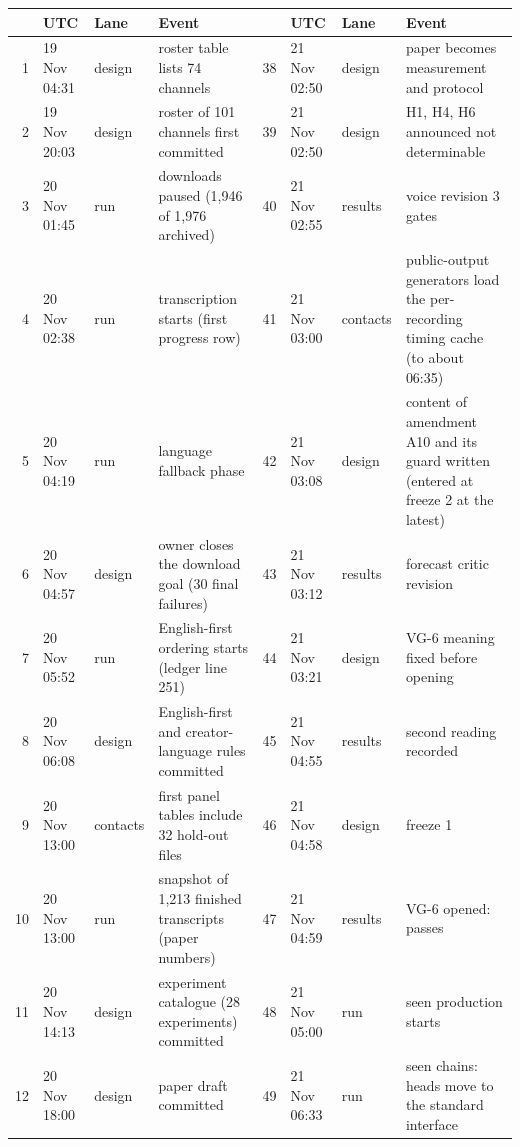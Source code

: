 {\tiny\setlength{\tabcolsep}{2pt}
\begin{tabular}{@{}rllp{}rllp{}@{}}
\toprule
 & UTC & Lane & Event &  & UTC & Lane & Event \\
\midrule
1 & 19 Nov 04:31 & design & roster table lists 74 channels & 38 & 21 Nov 02:50 & design & paper becomes measurement and protocol \\
2 & 19 Nov 20:03 & design & roster of 101 channels first committed & 39 & 21 Nov 02:50 & design & H1, H4, H6 announced not determinable \\
3 & 20 Nov 01:45 & run & downloads paused (1,946 of 1,976 archived) & 40 & 21 Nov 02:55 & results & voice revision 3 gates \\
4 & 20 Nov 02:38 & run & transcription starts (first progress row) & 41 & 21 Nov 03:00 & contacts & public-output generators load the per-recording timing cache (to about 06:35) \\
5 & 20 Nov 04:19 & run & language fallback phase & 42 & 21 Nov 03:08 & design & content of amendment A10 and its guard written (entered at freeze 2 at the latest) \\
6 & 20 Nov 04:57 & design & owner closes the download goal (30 final failures) & 43 & 21 Nov 03:12 & results & forecast critic revision \\
7 & 20 Nov 05:52 & run & English-first ordering starts (ledger line 251) & 44 & 21 Nov 03:21 & design & VG-6 meaning fixed before opening \\
8 & 20 Nov 06:08 & design & English-first and creator-language rules committed & 45 & 21 Nov 04:55 & results & second reading recorded \\
9 & 20 Nov 13:00 & contacts & first panel tables include 32 hold-out files & 46 & 21 Nov 04:58 & design & freeze 1 \\
10 & 20 Nov 13:00 & run & snapshot of 1,213 finished transcripts (paper numbers) & 47 & 21 Nov 04:59 & results & VG-6 opened: passes \\
11 & 20 Nov 14:13 & design & experiment catalogue (28 experiments) committed & 48 & 21 Nov 05:00 & run & seen production starts \\
12 & 20 Nov 18:00 & design & paper draft committed & 49 & 21 Nov 06:33 & run & seen chains: heads move to the standard interface \\

\end{tabular}}
